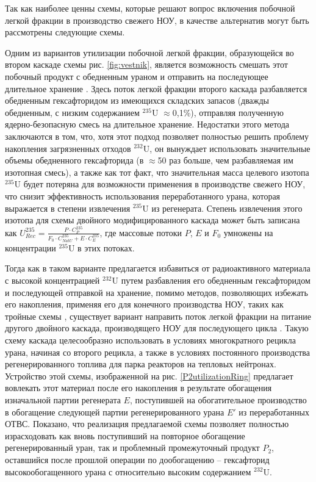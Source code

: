 
Так как наиболее ценны схемы, которые решают вопрос включения побочной легкой фракции в производство свежего НОУ, в качестве альтернатив могут быть рассмотрены следующие схемы.

Одним из вариантов утилизации побочной легкой фракции, образующейся во втором каскаде схемы рис. \ref{fig:vestnik}, является возможность смешать этот побочный продукт с обедненным ураном и отправить на последующее длительное хранение \cite{vodolazskihSposobIzotopnogoVosstanovleniya}. Здесь поток легкой фракции второго каскада разбавляется обедненным гексафторидом из имеющихся складских запасов (дважды обедненным, с низким содержанием $^{235}$U $\approx$0,1\%), отправляя полученную ядерно-безопасную смесь на длительное хранение. Недостатки этого метода заключаются в том, что, хотя этот подход позволяет полностью решить проблему накопления загрязненных отходов $^{232}$U, он вынуждает использовать значительные объемы обедненного гексафторида (в $\approx$50 раз больше, чем разбавляемая им изотопная смесь), а также как тот факт, что значительная масса целевого изотопа $^{235}$U будет потеряна для возможности применения в производстве свежего НОУ, что снизит эффективность использования переработанного урана, которая выражается в степени извлечения $^{235}$U из регенерата. Степень извлечения этого изотопа для схемы двойного модифицированного каскада может быть записана как
$U^{235}_{Rec} = \frac{P \cdot C_{P}^{235}}{F_0 \cdot C_{NatU}^{235} + E \cdot C_{E}^{235}}$, где массовые потоки $P$, $E$ и $F_0$ умножены на концентрации $^{235}$U в этих потоках.

Тогда как в таком варианте предлагается избавиться от радиоактивного материала с высокой концентрацией $^{232}$U путем разбавления его обедненным гексафторидом и последующей отправкой на хранение, помимо методов, позволяющих избежать его накопления, применяя его для конечного производства НОУ, таких как тройные схемы \cite{smirnovMethodEnrichReprocessed2019}, существует вариант направить поток легкой фракции на питание другого двойного каскада, производящего НОУ для последующего цикла \cite{nevinicaToplivnyyCiklLegkovodnogo2019}. Такую схему  каскада целесообразно использовать в условиях многократного рецикла урана, начиная со второго рецикла, а также в условиях постоянного производства регенерированного топлива для парка реакторов на тепловых нейтронах. Устройство этой схемы, изображенной на рис. \ref{P2utilizationRing} предлагает вовлекать этот материал после его накопления в результате обогащения изначальной партии регенерата $E$, поступившей на обогатительное производство в обогащение следующей партии регенерированного урана $E'$ из переработанных ОТВС. Показано, что реализация предлагаемой схемы позволяет полностью израсходовать как вновь поступивший на повторное обогащение регенерированный уран, так и проблемный промежуточный продукт $P_2$, оставшийся после прошлой операции по дообогащению -- гексафторид высокообогащенного урана с относительно высоким содержанием $^{232}$U.

